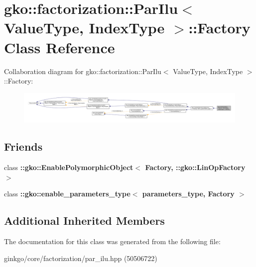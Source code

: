 \hypertarget{classgko_1_1factorization_1_1ParIlu_1_1Factory}{}\section{gko\+:\+:factorization\+:\+:Par\+Ilu$<$ Value\+Type, Index\+Type $>$\+:\+:Factory Class Reference}
\label{classgko_1_1factorization_1_1ParIlu_1_1Factory}


Collaboration diagram for gko\+:\+:factorization\+:\+:Par\+Ilu$<$ Value\+Type, Index\+Type $>$\+:\+:Factory\+:
\nopagebreak
\begin{figure}[H]
\begin{center}
\leavevmode
\includegraphics[width=350pt]{classgko_1_1factorization_1_1ParIlu_1_1Factory__coll__graph}
\end{center}
\end{figure}
\subsection*{Friends}
\begin{DoxyCompactItemize}
\item 
\mbox{\label{classgko_1_1factorization_1_1ParIlu_1_1Factory_a27e9bbc94a1c1c59f40833153eda8f78}} 
class {\bfseries \+::gko\+::\+Enable\+Polymorphic\+Object$<$ Factory, \+::gko\+::\+Lin\+Op\+Factory $>$}
\item 
\mbox{\label{classgko_1_1factorization_1_1ParIlu_1_1Factory_a0d176cbd42d6214e11aee8c30ca256fc}} 
class {\bfseries \+::gko\+::enable\+\_\+parameters\+\_\+type$<$ parameters\+\_\+type, Factory $>$}
\end{DoxyCompactItemize}
\subsection*{Additional Inherited Members}


The documentation for this class was generated from the following file\+:\begin{DoxyCompactItemize}
\item 
ginkgo/core/factorization/par\+\_\+ilu.\+hpp (50506722)\end{DoxyCompactItemize}
